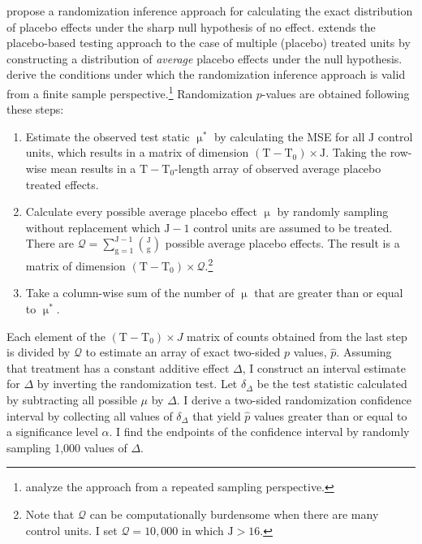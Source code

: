 \documentclass[hidelinks,12pt]{article}
\begin{document}
\citet{abadie2010synthetic} propose a randomization inference approach for calculating the exact distribution of placebo effects under the sharp null hypothesis of no effect. \citet{cavallo2013catastrophic} extends the placebo-based testing approach to the case of multiple (placebo) treated units by constructing a distribution of \emph{average} placebo effects under the null hypothesis. \citet{firpo2018synthetic} derive the conditions under which the randomization inference approach is valid from a finite sample perspective.\footnote{\citet{hahn2017synthetic} analyze the approach from a repeated sampling perspective.} Randomization $p$-values are obtained following these steps:

\begin{enumerate} 
	\item Estimate the observed test static $\upmu^{*}$ by calculating the MSE for all $\text{J}$ control units, which results in a matrix of dimension $(\text{T}-\text{T}_0) \times \text{J}$. Taking the row-wise mean results in a $\text{T}-\text{T}_0$-length array of observed average placebo treated effects. 
	\item Calculate every possible average placebo effect $\upmu$ by randomly sampling without replacement which $\text{J}-1$ control units are assumed to be treated. There are $\mathcal{Q} = \sum\limits_{\text{g}=1}^{\text{J}-1} {\text{J} \choose \text{g}}$ possible average placebo effects. The result is a matrix of dimension $(\text{T}-\text{T}_0) \times \mathcal{Q}$.\footnote{Note that $\mathcal{Q}$ can be computationally burdensome when there are many control units. I set $\mathcal{Q} = 10,000$ in which $\text{J} > 16$.}
	\item Take a column-wise sum of the number of $\upmu$ that are greater than or equal to $\upmu^{*}$.  
\end{enumerate}

Each element of the $(\text{T}-\text{T}_0) \times J$ matrix of counts obtained from the last step is divided by $\mathcal{Q}$ to estimate an array of exact two-sided $p$ values, $\hat{p}$. Assuming that treatment has a constant additive effect $\Delta$, I construct an interval estimate for $\Delta$ by inverting the randomization test. Let $\delta_\Delta$ be the test statistic calculated by subtracting all possible $\mu$ by $\Delta$. I derive a two-sided randomization confidence interval by collecting all values of $\delta_\Delta$ that yield $\hat{p}$ values greater than or equal to a significance level $\alpha$. I find the endpoints of the confidence interval by randomly sampling 1,000 values of $\Delta$.
\end{document}
